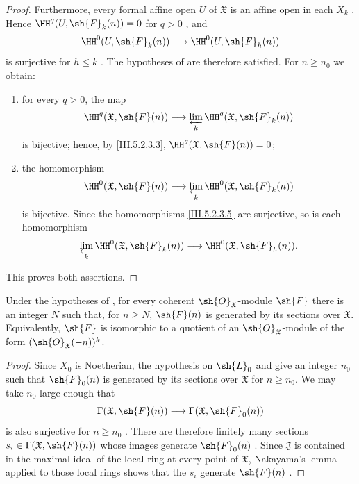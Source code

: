 \begin{proof}
Furthermore, every formal affine open $U$ of $\mathfrak{X}$ is an
affine open in each $X_k$ .  Hence
$\HH^q(U,\sh{F}_k(n))=0$ for $q>0$ , and
\[
  \HH^0(U,\sh{F}_k(n))
  \longrightarrow
  \HH^0(U,\sh{F}_h(n))
\]
is surjective for $h\leq k$ .  The hypotheses of
 are therefore satisfied.  For $n\geq n_0$ we
obtain:
\begin{enumerate}
  \item[$1^\circ$] for every $q>0$, the map
    \[
      \HH^q(\mathfrak{X},\sh{F}(n))
      \longrightarrow
      \varprojlim_k
      \HH^q(\mathfrak{X},\sh{F}_k(n))
    \]
    is bijective; hence, by \eqref{III.5.2.3.3},
    $\HH^q(\mathfrak{X},\sh{F}(n))=0$;
  \item[$2^\circ$] the homomorphism
    \[
      \HH^0(\mathfrak{X},\sh{F}(n))
      \longrightarrow
      \varprojlim_k
      \HH^0(\mathfrak{X},\sh{F}_k(n))
    \]
    is bijective.  Since the homomorphisms
    \eqref{III.5.2.3.5} are surjective, so is each homomorphism
    \[
      \varprojlim_k
      \HH^0(\mathfrak{X},\sh{F}_k(n))
      \longrightarrow
      \HH^0(\mathfrak{X},\sh{F}_h(n)).
    \]
\end{enumerate}
This proves both assertions.
\end{proof}

\begin{corollary}[5.2.4]
\label{III.5.2.4}
Under the hypotheses of , for every coherent
$\sh{O}_{\mathfrak{X}}$-module $\sh{F}$ there is an integer $N$
such that, for $n\geq N$, $\sh{F}(n)$ is generated by its sections
over
$\mathfrak{X}$.  Equivalently, $\sh{F}$ is isomorphic to a quotient
of an $\sh{O}_{\mathfrak{X}}$-module of the form
$(\sh{O}_{\mathfrak{X}}(-n))^k$.
\end{corollary}

\begin{proof}
Since $X_0$ is Noetherian, the hypothesis on $\sh{L}_0$ and
 give an integer $n_0$ such that
$\sh{F}_0(n)$ is generated by its sections over $\mathfrak{X}$ for
$n\geq n_0$.  We may take $n_0$ large enough that
\[
  \Gamma(\mathfrak{X},\sh{F}(n))
  \longrightarrow
  \Gamma(\mathfrak{X},\sh{F}_0(n))
\]
is also surjective for $n\geq n_0$ .  There are
therefore finitely many sections
$s_i\in\Gamma(\mathfrak{X},\sh{F}(n))$ whose images generate
$\sh{F}_0(n)$ .  Since $\mathfrak{J}$ is
contained in the maximal ideal of the local ring at every point
of $\mathfrak{X}$, Nakayama's lemma applied to those local rings
shows that the $s_i$ generate $\sh{F}(n)$
.
\end{proof}

